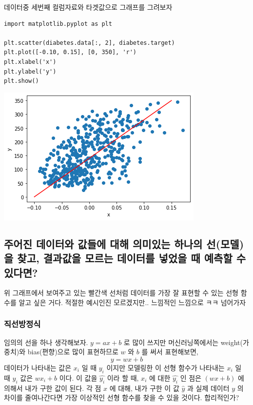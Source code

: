\documentclass[11pt]{article}
\begin{document}
데이터중 세번째 컬럼자료와 타겟값으로 그래프를 그려보자
\begin{verbatim}
import matplotlib.pyplot as plt

plt.scatter(diabetes.data[:, 2], diabetes.target)
plt.plot([-0.10, 0.15], [0, 350], 'r')
plt.xlabel('x')
plt.ylabel('y')
plt.show()
\end{verbatim}

\begin{center}
\includegraphics[width=.9\linewidth]{./obipy-resources/iHIRsI.png}
\end{center}

\subsection{주어진 데이터와 값들에 대해 의미있는 하나의 선(모델)을 찾고, 결과값을 모르는 데이터를 넣었을 때 예측할 수 있다면?}
\label{sec:org252a5af}

위 그래프에서 보여주고 있는 빨간색 선처럼 데이터를 가장 잘 표현할 수 있는 선형 함수를 알고 싶은 거다. 적절한 예시인진 모르겠지만.. 느낌적인 느낌으로 ㅋㅋ 넘어가자

\subsubsection{직선방정식}
\label{sec:org74f8487}
임의의 선을 하나 생각해보자. \(y=ax+b\) 로 많이 쓰지만 머신러닝쪽에서는 weight(가중치)와 bias(편향)으로 많이 표현하므로 \(w\) 와 \(b\) 를 써서 표현해보면,
\begin{equation*}
  y = wx + b
\end{equation*}
데이터가 나타내는 값은 \(x_{i}\) 일 때 \(y_{i}\) 이지만 모델링한 이 선형 함수가 나타내는 \(x_{i}\) 일 때 \(y_{i}\) 값은 \(wx_{i}+b\) 이다. 이 값을 \(\hat{y_{i}}\) 이라 할 때, \(x_{i}\) 에 대한 \(\hat{y_{i}}\) 인 점은 \((wx+b)\) 에 의해서 내가 구한 값이 된다. 각 점 \(x\) 에 대해, 내가 구한 이 값 \(\hat{y}\) 과 실제 데이터 \(y\) 의 차이를 줄여나간다면 가장 이상적인 선형 함수를 찾을 수 있을 것이다. 합리적인가? 
\end{document}

